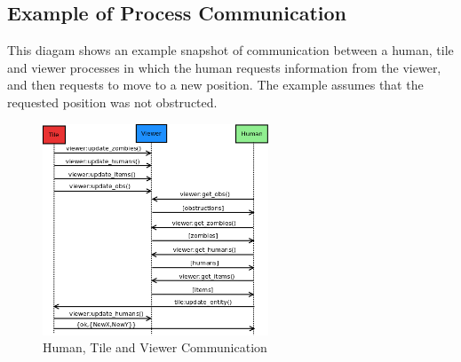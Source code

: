 \subsection{Example of Process Communication}
This diagam shows an example snapshot of communication between a human, tile and viewer processes in which the human  requests information from the viewer, and then requests to move to a new position. The example assumes that the requested position was not obstructed.
\begin{figure}[h]
  \centering
  \includegraphics[width=0.6\textwidth]{img/tile-viewer-human-msgs.png}
  \caption{Human, Tile and Viewer Communication}
  \label{fig:tile_viewer_communication}
\end{figure}

\clearpage
\endinput
